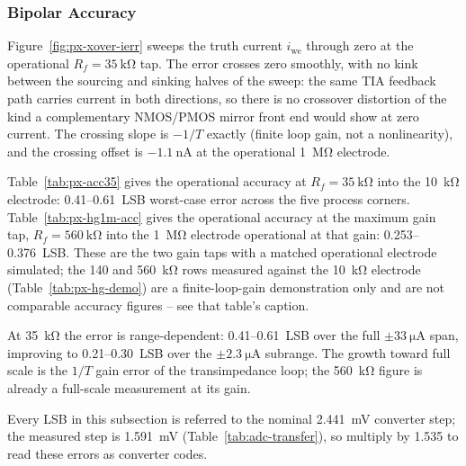 %
%

\subsubsection{Bipolar Accuracy}\label{sss:pixel-accuracy}

Figure~\ref{fig:px-xover-ierr} sweeps the truth current $i_{\mathrm{we}}$
through zero at the operational $R_f = \SI{35}{\kilo\ohm}$ tap. The error
crosses zero smoothly, with no kink between the sourcing and sinking halves of
the sweep: the same TIA feedback path carries current in both directions, so
there is no crossover distortion of the kind a complementary NMOS/PMOS mirror
front end would show at zero current. The crossing slope is $-1/T$ exactly
(finite loop gain, not a nonlinearity), and the crossing offset is
$\SI{-1.1}{\nano\ampere}$ at the operational \SI{1}{\mega\ohm} electrode.

Table~\ref{tab:px-acc35} gives the operational accuracy at $R_f =
\SI{35}{\kilo\ohm}$ into the \SI{10}{\kilo\ohm} electrode: 0.41--0.61~LSB
worst-case error across the five process corners. Table~\ref{tab:px-hg1m-acc}
gives the operational accuracy at the maximum gain tap, $R_f = \SI{560}
{\kilo\ohm}$ into the \SI{1}{\mega\ohm} electrode operational at that gain:
0.253--0.376~LSB. These are the two gain taps with a matched
operational electrode simulated; the 140 and \SI{560}{\kilo\ohm} rows measured
against the \SI{10}{\kilo\ohm} electrode (Table~\ref{tab:px-hg-demo}) are a
finite-loop-gain demonstration only and are not comparable accuracy figures --
see that table's caption.

At \SI{35}{\kilo\ohm} the error is range-dependent: 0.41--0.61~LSB over the
full $\pm\SI{33}{\micro\ampere}$ span, improving to 0.21--0.30~LSB over the
$\pm\SI{2.3}{\micro\ampere}$ subrange. The growth toward full scale is the
$1/T$ gain error of the transimpedance loop; the \SI{560}{\kilo\ohm} figure is
already a full-scale measurement at its gain.

Every LSB in this subsection is referred to the nominal
\SI{2.441}{\milli\volt} converter step; the measured step is
\SI{1.591}{\milli\volt} (Table~\ref{tab:adc-transfer}), so multiply by
\num{1.535} to read these errors as converter codes.
